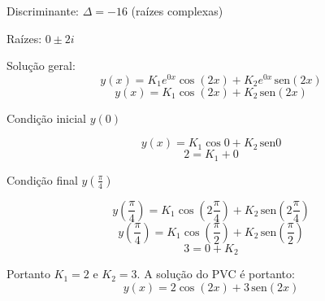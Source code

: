 \documentclass[a4paper]{article}
\providecommand{\sin}{} \renewcommand{\sin}{\hspace{2pt}\mathrm{sen}}
\begin{document}
\begin{multicols}{2}
Discriminante: $\Delta=-16$ (raízes complexas)

Raízes: $0 \pm 2i$

Solução geral:
\begin{displaymath}
  y(x) = K_1e^{0 x}\cos(2 x) + K_2e^{0 x}\sin(2 x)
\end{displaymath}
\begin{displaymath}
  y(x) = K_1\cos(2 x) + K_2\sin(2 x)
\end{displaymath}

Condição inicial $y(0)$

\begin{displaymath}
  y(x) = K_1\cos 0 + K_2\sin 0
\end{displaymath}
\begin{displaymath}
  2 = K_1+0
\end{displaymath}

Condição final $y(\frac{\pi}{4})$

\begin{displaymath}
  y(\frac{\pi}{4}) = K_1\cos(2 \frac{\pi}{4}) + K_2\sin(2 \frac{\pi}{4})
\end{displaymath}
\begin{displaymath}
  y(\frac{\pi}{4}) = K_1\cos( \frac{\pi}{2}) + K_2\sin( \frac{\pi}{2})
\end{displaymath}
\begin{displaymath}
  3 = 0+K_2
\end{displaymath}

Portanto $K_1=2$ e $K_2=3$. A solução do PVC é portanto:
\begin{displaymath}
  y(x) = 2\cos(2 x) +3\sin(2 x)
\end{displaymath}

\end{multicols}
\end{document}

